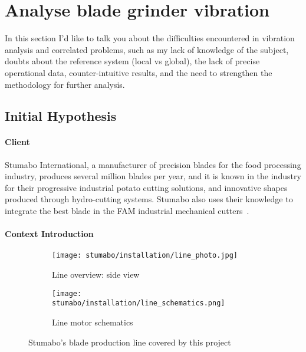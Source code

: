
\section{Analyse blade grinder vibration}
In this section I'd like to talk you about the difficulties encountered in vibration analysis and correlated problems, such as my lack of knowledge of the subject, 
doubts about the reference system (local vs global),
the lack of precise operational data, counter-intuitive results, and the need to strengthen the methodology for further analysis.


\subsection{Initial Hypothesis}
\paragraph{Client} Stumabo International, a manufacturer of precision blades for the food processing industry, produces several million blades per year, 
and it is known in the industry for their progressive industrial potato cutting solutions, and innovative shapes produced through hydro-cutting systems.
Stumabo also uses their knowledge to integrate the best blade in the FAM industrial mechanical cutters~\cite{Misc:stumabo_en_website}.

\paragraph{Context Introduction}
\begin{figure}[ht]
    \begin{subfigure}{\textwidth}
        \texttt{[image: stumabo/installation/line\_photo.jpg]}
        \caption{Line overview: side view}
        \label{fig:line_overview}
    \end{subfigure}
    \begin{subfigure}{\textwidth}
        \texttt{[image: stumabo/installation/line\_schematics.png]}
        \caption{Line motor schematics}
        \label{fig:line_schematics}
    \end{subfigure}
    \caption{Stumabo's blade production line covered by this project}
    \label{fig:stumabo_prod_line}
\end{figure}

